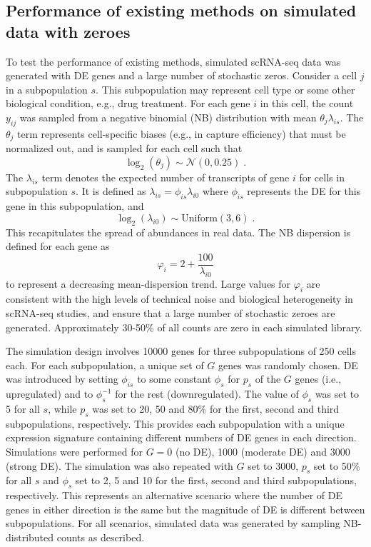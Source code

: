 \documentclass{article}
\begin{document}
\subsection{Performance of existing methods on simulated data with zeroes}
To test the performance of existing methods, simulated scRNA-seq data was generated with DE genes and a large number of stochastic zeros.
Consider a cell $j$ in a subpopulation $s$.
This subpopulation may represent cell type or some other biological condition, e.g., drug treatment. 
For each gene $i$ in this cell, the count $y_{ij}$ was sampled from a negative binomial (NB) distribution with mean $\theta_{j}\lambda_{is}$.
The $\theta_{j}$ term represents cell-specific biases (e.g., in capture efficiency) that must be normalized out, 
    and is sampled for each cell such that 
\[
\log_2(\theta_j) \sim \mathcal{N}(0, 0.25) \;.
\]
The $\lambda_{is}$ term denotes the expected number of transcripts of gene $i$ for cells in subpopulation $s$.
It is defined as $\lambda_{is}=\phi_{is}\lambda_{i0}$ where $\phi_{is}$ represents the DE for this gene in this subpopulation, and 
\[
\log_2(\lambda_{i0}) \sim \mbox{Uniform}(3, 6) \;.
\]
This recapitulates the spread of abundances in real data.
The NB dispersion is defined for each gene as 
\[
    \varphi_i = 2 + \frac{100}{\lambda_{i0}}
\]
to represent a decreasing mean-dispersion trend.
Large values for $\varphi_i$ are consistent with the high levels of technical noise and biological heterogeneity in scRNA-seq studies,
    and ensure that a large number of stochastic zeroes are generated.
Approximately 30-50\% of all counts are zero in each simulated library.

The simulation design involves 10000 genes for three subpopulations of 250 cells each.
For each subpopulation, a unique set of $G$ genes was randomly chosen.
DE was introduced by setting $\phi_{is}$ to some constant $\phi_s$ for $p_s$ of the $G$ genes (i.e., upregulated) and to $\phi_s^{-1}$ for the rest (downregulated).
The value of $\phi_s$ was set to 5 for all $s$, while $p_s$ was set to 20, 50 and 80\% for the first, second and third subpopulations, respectively.
This provides each subpopulation with a unique expression signature containing different numbers of DE genes in each direction.
Simulations were performed for $G = 0$ (no DE), 1000 (moderate DE) and 3000 (strong DE).
The simulation was also repeated with $G$ set to 3000, $p_s$ set to 50\% for all $s$ and $\phi_{s}$ set to 2, 5 and 10 for the first, second and third subpopulations, respectively.
This represents an alternative scenario where the number of DE genes in either direction is the same but the magnitude of DE is different between subpopulations.
For all scenarios, simulated data was generated by sampling NB-distributed counts as described.
\end{document}
